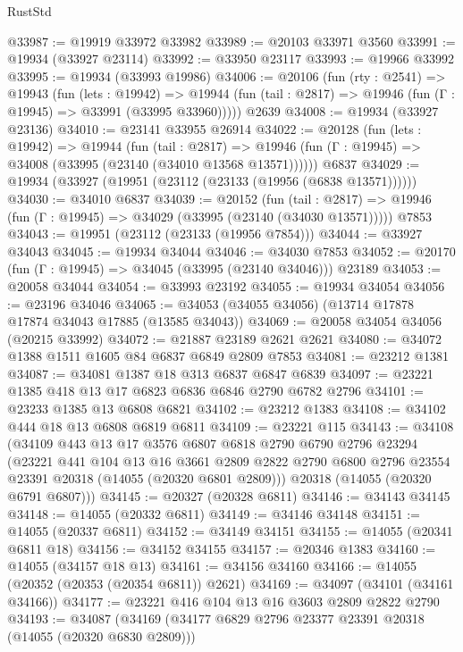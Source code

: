 \begin{lexlean}{RustStd}
\begin{coremodule}
@33987 := @19919 @33972 @33982
@33989 := @20103 @33971 @3560
@33991 := @19934 (@33927 @23114)
@33992 := @33950 @23117
@33993 := @19966 @33992
@33995 := @19934 (@33993 @19986)
@34006 := @20106
    (fun (rty : @2541) =>
    @19943
      (fun (lets : @19942) =>
      @19944 (fun (tail : @2817) => @19946 (fun (Γ : @19945) => @33991 (@33995 @33960)))))
    @2639
@34008 := @19934 (@33927 @23136)
@34010 := @23141 @33955 @26914
@34022 := @20128
    (fun (lets : @19942) =>
    @19944
      (fun (tail : @2817) =>
      @19946 (fun (Γ : @19945) => @34008 (@33995 (@23140 (@34010 @13568 @13571))))))
    @6837
@34029 := @19934 (@33927 (@19951 (@23112 (@23133 (@19956 (@6838 @13571))))))
@34030 := @34010 @6837
@34039 := @20152
    (fun (tail : @2817) => @19946 (fun (Γ : @19945) => @34029 (@33995 (@23140 (@34030 @13571)))))
    @7853
@34043 := @19951 (@23112 (@23133 (@19956 @7854)))
@34044 := @33927 @34043
@34045 := @19934 @34044
@34046 := @34030 @7853
@34052 := @20170 (fun (Γ : @19945) => @34045 (@33995 (@23140 @34046))) @23189
@34053 := @20058 @34044
@34054 := @33993 @23192
@34055 := @19934 @34054
@34056 := @23196 @34046
@34065 := @34053 (@34055 @34056) (@13714 @17878 @17874 @34043 @17885 (@13585 @34043))
@34069 := @20058 @34054 @34056 (@20215 @33992)
@34072 := @21887 @23189 @2621 @2621
@34080 := @34072 @1388 @1511 @1605 @84 @6837 @6849 @2809 @7853
@34081 := @23212 @1381
@34087 := @34081 @1387 @18 @313 @6837 @6847 @6839
@34097 := @23221 @1385 @418 @13 @17 @6823 @6836 @6846 @2790 @6782 @2796
@34101 := @23233 @1385 @13 @6808 @6821
@34102 := @23212 @1383
@34108 := @34102 @444 @18 @13 @6808 @6819 @6811
@34109 := @23221 @115
@34143 := @34108
    (@34109
      @443
      @13
      @17
      @3576
      @6807
      @6818
      @2790
      @6790
      @2796
      @23294
      (@23221
        @441
        @104
        @13
        @16
        @3661
        @2809
        @2822
        @2790
        @6800
        @2796
        @23554
        @23391
        @20318
        (@14055 (@20320 @6801 @2809)))
      @20318
      (@14055 (@20320 @6791 @6807)))
@34145 := @20327 (@20328 @6811)
@34146 := @34143 @34145
@34148 := @14055 (@20332 @6811)
@34149 := @34146 @34148
@34151 := @14055 (@20337 @6811)
@34152 := @34149 @34151
@34155 := @14055 (@20341 @6811 @18)
@34156 := @34152 @34155
@34157 := @20346 @1383
@34160 := @14055 (@34157 @18 @13)
@34161 := @34156 @34160
@34166 := @14055 (@20352 (@20353 (@20354 @6811)) @2621)
@34169 := @34097 (@34101 (@34161 @34166))
@34177 := @23221 @416 @104 @13 @16 @3603 @2809 @2822 @2790
@34193 := @34087
    (@34169
      (@34177 @6829 @2796 @23377 @23391 @20318 (@14055 (@20320 @6830 @2809)))

\end{coremodule}
\end{lexlean}

